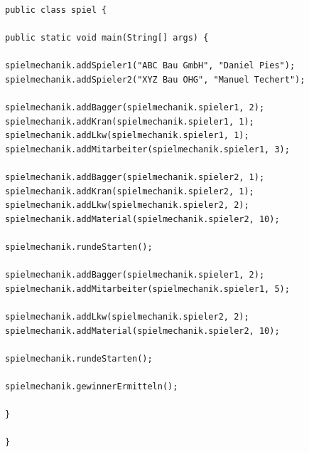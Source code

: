 \lstset{language=Java}
\begin{lstlisting}[caption={Beispiel für die Klasse \glqq Spiel\grqq}, label={lst:prototypspiel}]
public class spiel {

public static void main(String[] args) {

spielmechanik.addSpieler1("ABC Bau GmbH", "Daniel Pies");
spielmechanik.addSpieler2("XYZ Bau OHG", "Manuel Techert");

spielmechanik.addBagger(spielmechanik.spieler1, 2);
spielmechanik.addKran(spielmechanik.spieler1, 1);
spielmechanik.addLkw(spielmechanik.spieler1, 1);
spielmechanik.addMitarbeiter(spielmechanik.spieler1, 3);

spielmechanik.addBagger(spielmechanik.spieler2, 1);
spielmechanik.addKran(spielmechanik.spieler2, 1);
spielmechanik.addLkw(spielmechanik.spieler2, 2);
spielmechanik.addMaterial(spielmechanik.spieler2, 10);

spielmechanik.rundeStarten();

spielmechanik.addBagger(spielmechanik.spieler1, 2);
spielmechanik.addMitarbeiter(spielmechanik.spieler1, 5);

spielmechanik.addLkw(spielmechanik.spieler2, 2);
spielmechanik.addMaterial(spielmechanik.spieler2, 10);

spielmechanik.rundeStarten();

spielmechanik.gewinnerErmitteln();

}

}

\end{lstlisting}